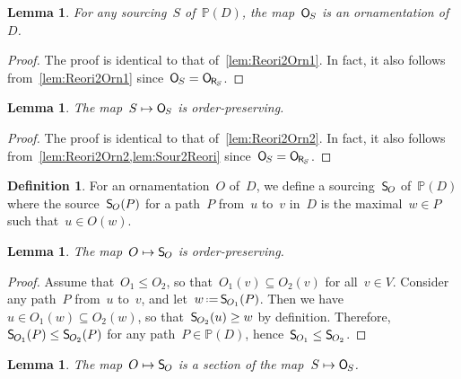 \documentclass{amsart}
\newtheorem{lemma}[theorem]{Lemma}
\theoremstyle{definition}
\newtheorem{definition}[theorem]{Definition}
\newcommand{\eqdef}{\mbox{\,\raisebox{0.2ex}{\scriptsize\ensuremath{\mathrm:}}\ensuremath{=}\,}} %
\newcommand{\mymap}[2]{\mathsf{#1}_{\hspace{-.7pt}#2}}
\newcommand{\orn}[1]{\mymap{O}{#1}}  %
\newcommand{\reori}[1]{\mymap{R}{#1}}  %
\DeclareMathOperator{\rev}{rev} %
\newcommand{\sour}[1]{\mymap{S}{#1}}  %
\newcommand{\PP}{\mathbb P} %
\begin{document}
\begin{lemma}
\label{lem:Sour2Orn2}
For any sourcing~$S$ of~$\PP(D)$, the map~$\orn{S}$ is an ornamentation of~$D$.
\end{lemma}

\begin{proof}
The proof is identical to that of~\cref{lem:Reori2Orn1}.
In fact, it also follows from~\cref{lem:Reori2Orn1} since~$\orn{S} = \orn{\reori{S}}$.
\end{proof}

\begin{lemma}
\label{lem:Sour2Orn2}
The map~$S \mapsto \orn{S}$ is order-preserving.
\end{lemma}

\begin{proof}
The proof is identical to that of~\cref{lem:Reori2Orn2}.
In fact, it also follows from~\cref{lem:Reori2Orn2,lem:Sour2Reori} since~$\orn{S} = \orn{\reori{S}}$.
\end{proof}

\begin{definition}
For an ornamentation~$O$ of~$D$, we define a sourcing~$\sour{O}$ of~$\PP(D)$ where the source~$\sour{O}(P)$ for a path~$P$ from~$u$ to~$v$ in~$D$ is the maximal~$w \in P$ such that~$u \in O(w)$.
\end{definition}

\begin{lemma}
\label{lem:Orn2Sour1}
The map~$O \mapsto \sour{O}$ is order-preserving.
\end{lemma}

\begin{proof}
Assume that~$O_1 \le O_2$, so that~$O_1(v) \subseteq O_2(v)$ for all~$v \in V$.
Consider any path~$P$ from~$u$ to~$v$, and let~$w \eqdef \sour{O_1}(P)$.
Then we have~$u \in O_1(w) \subseteq O_2(w)$, so that~$\sour{O_2}(u) \ge w$ by definition.
Therefore, $\sour{O_1}(P) \le \sour{O_2}(P)$ for any path~$P \in \PP(D)$, hence~${\sour{O_1} \le \sour{O_2}}$.
\end{proof}

\begin{lemma}
\label{lem:Orn2Sour2}
The map~$O \mapsto \sour{O}$ is a section of the map~$S \mapsto \orn{S}$.
\end{lemma}
\end{document}
